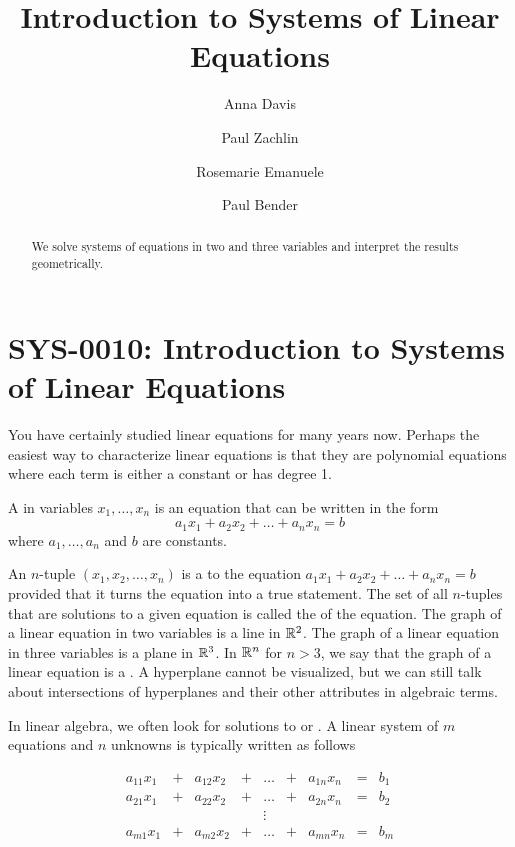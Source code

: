 \documentclass{ximera}
\author{Anna Davis \and Paul Zachlin \and Rosemarie Emanuele \and Paul Bender} \title{Introduction to Systems of Linear Equations} \license{CC-BY 4.0}
\begin{document}
\begin{abstract}
 We solve systems of equations in two and three variables and interpret the results geometrically.
\end{abstract}
\maketitle
\section*{SYS-0010:  Introduction to Systems of Linear Equations}
You have certainly studied linear equations for many years now.  Perhaps the easiest way to characterize linear equations is that they are polynomial equations where each term is either a constant or has degree 1.

\begin{definition}\label{def:lineq}
A  in variables $x_1, \ldots, x_n$ is an equation that can be written in the form
$$a_1x_1+a_2x_2+\ldots +a_nx_n=b$$
where $a_1,\ldots ,a_n$ and $b$ are constants.
\end{definition}


An $n$-tuple $(x_1, x_2,\ldots ,x_n)$ is a  to the equation $a_1x_1+a_2x_2+\ldots +a_nx_n=b$ provided that it turns the equation into a true statement.  The set of all $n$-tuples that are solutions to a given equation is called the  of the equation. The graph of a linear equation in two variables is a line in $\mathbb{R}^2$.  The graph of a linear equation in three variables is a plane in $\mathbb{R}^3$.  In $\mathbb{R}^n$ for $n>3$, we say that the graph of a linear equation is a . A hyperplane cannot be visualized, but we can still talk about intersections of hyperplanes and their other attributes in algebraic terms.  

In linear algebra, we often look for solutions to  or .  
A linear system of $m$ equations and $n$ unknowns is typically written as follows

$$\begin{array}{ccccccccc}
      a_{11}x_1 &+ &a_{12}x_2&+&\ldots&+&a_{1n}x_n&= &b_1 \\
	 a_{21}x_1 &+ &a_{22}x_2&+&\ldots&+&a_{2n}x_n&= &b_2 \\
     &&&&\vdots&&&& \\
     a_{m1}x_1 &+ &a_{m2}x_2&+&\ldots&+&a_{mn}x_n&= &b_m
    \end{array}$$
\end{document}

